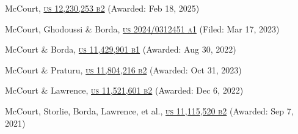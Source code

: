 \begin{patnumerate}
%
\item \begin{minipage}[t]{\textwidth} McCourt, \href{https://patents.google.com/patent/US12230253B2}{\textsc{us 12,230,253 b2}} (Awarded: Feb 18, 2025)\\
  \end{minipage}

\item \begin{minipage}[t]{\textwidth} McCourt, Ghodoussi \& Borda, \href{https://patents.google.com/patent/US20240312451A1}{\textsc{us 2024/0312451 a1}} (Filed: Mar 17, 2023)\\
  \end{minipage}

\item \begin{minipage}[t]{\textwidth} McCourt \& Borda, \href{https://patents.google.com/patent/US11429901B1}{\textsc{us 11,429,901 b1}} (Awarded: Aug 30, 2022)\\
  \end{minipage}

\item \begin{minipage}[t]{\textwidth} McCourt \& Praturu, \href{https://patents.google.com/patent/US11804216}{\textsc{us 11,804,216 b2}} (Awarded: Oct 31, 2023)\\
  \end{minipage}

\item \begin{minipage}[t]{\textwidth} McCourt \& Lawrence, \href{https://patents.google.com/patent/US11521601B2}{\textsc{us 11,521,601 b2}} (Awarded: Dec 6, 2022)\\
  \end{minipage}

\item \begin{minipage}[t]{\textwidth} McCourt, Storlie, Borda, Lawrence, et al., \href{https://patents.google.com/patent/US11115520B2}{\textsc{us 11,115,520 b2}} (Awarded: Sep 7, 2021)\\
  \end{minipage}


\end{patnumerate}
